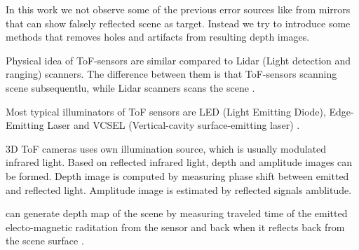 In this work we not observe some of the previous error sources like from mirrors that can show falsely reflected scene as target.
Instead we try to introduce some methods that removes holes and artifacts from resulting depth images.



Physical idea of ToF-sensors are similar compared to Lidar (Light detection and ranging) scanners. The difference
between them is that ToF-sensors scanning scene subsequentlu, while Lidar scanners scans the scene .



Most typical illuminators of ToF sensors are LED (Light Emitting Diode),
Edge-Emitting Laser and VCSEL (Vertical-cavity surface-emitting laser) \cite{TI2019}.

3D ToF cameras uses own illumination source, which is usually modulated infrared light. Based on reflected infrared light,
depth and amplitude images can be formed. Depth image is computed by measuring phase shift between emitted and reflected light.
Amplitude image is estimated by reflected signals amblitude. \cite{inproceedings}












can generate depth map of the scene by measuring traveled time of the emitted electo-magnetic
raditation from the sensor and back when it reflects back from the scene surface \cite{tof}\cite{vizta}.

